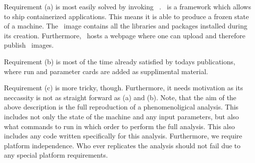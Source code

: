 Requirement (a) is most easily solved by invoking
\docker~\cite{}. \docker~is a framework which allows to ship
containerized applications. This means it is able to produce a frozen
state of a machine. The \docker~image contains all the libraries and
packages installed during its creation. Furthermore, \docker~hosts a
webpage where one can upload and therefore publish \docker~images.

Requirement (b) is most of the time already satisfied by todays
publications, where run and parameter cards are added as supplimental
material.

Requirement (c) is more tricky, though. Furthermore, it needs
motivation as its neccassity is not as straight forward as (a) and
(b). Note, that the aim of the above description is the full
reproduction of a phenomenoligical analysis. This includes not only
the state of the machine and any input parameters, but also what
commands to run in which order to perform the full analysis. This also
includes any code written specifically for this analysis. Furthermore,
we require platform independence. Who ever replicates the analysis
should not fail due to any special platform requirements.


